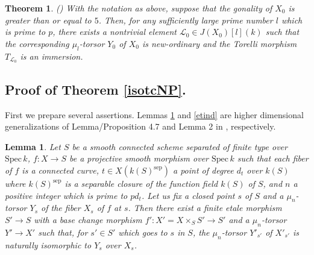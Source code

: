 \documentclass[11pt]{amsart}
\newtheorem{theorem}[Lemma]{Theorem}
\newtheorem{lemma}[Lemma]{Lemma}
\begin{document}
\begin{theorem}\label{tore} \mbox{\rm (\cite[Theorem 3.3]{saidi})} With the notation as above, 
suppose that the gonality of $X_0$ is greater than or equal to $5$. 
Then, for any sufficiently large prime number $l$ which is prime to $p$, 
there exists a nontrivial element $\mathcal L_0 \in J(X_0)[l](k)$ such that 
the corresponding $\mu_l$-torsor $Y_0$ of $X_0$ is new-ordinary and 
the Torelli morphism $T_{\mathcal L_0}$ is an immersion. 
\end{theorem} 

\subsection{Proof of Theorem \ref{isotcNP}.} 
First we prepare several assertions. 
Lemmas \ref{sai2} and \ref{etind} are higher dimensional generalizations 
of Lemma/Proposition 4.7 and Lemma 2 in \cite{saidi}, respectively. 

\begin{lemma}\label{sai2} Let $S$ be a smooth connected 
scheme separated of finite type over $\mathrm{Spec}\, k$, 
$f : X \rightarrow S$ be a projective smooth morphism over $\mathrm{Spec}\, k$ such that 
each fiber of $f$ is a connected curve, $t \in X(k(S)^{\mathrm{sep}})$ a point of degree $d_t$ over $k(S)$ 
where $k(S)^{\mathrm{sep}}$ is a separable closure of the function field $k(S)$ of $S$, 
and $n$ a positive integer which is prime to $pd_t$.   
Let us fix a closed point $s$ of $S$ and a $\mu_n$-torsor $Y_s$ of the fiber $X_s$ of $f$ at $s$. 
Then there exist a finite etale morphism $S' \rightarrow S$ with a base change morphism 
$f' : X' = X \times_S S' \rightarrow S'$ and a $\mu_n$-torsor 
$Y' \rightarrow X'$ such that, for $s' \in S'$ which goes to $s$ in $S$, the $\mu_n$-torsor $Y'_{s'}$ 
of $X'_{s'}$ is naturally isomorphic to $Y_s$ over $X_s$. 
\end{lemma}
\end{document}
